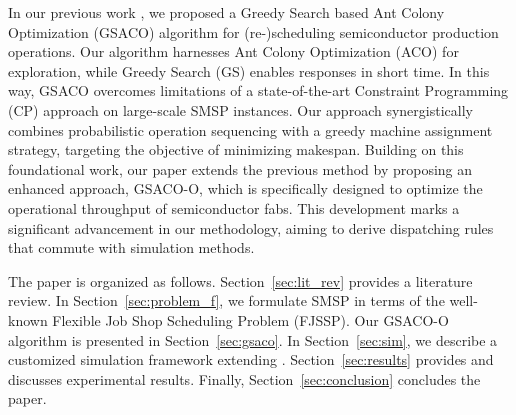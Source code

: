 In our previous work \cite{Ali2024}, we proposed a Greedy Search based Ant Colony Optimization (GSACO)
algorithm for (re-)scheduling semiconductor production operations. 
Our algorithm harnesses Ant Colony Optimization (ACO) \cite{Dorigo2019} for exploration, while
Greedy Search (GS) \cite{Papadimitriou} enables responses in short time. 
In this way, GSACO overcomes limitations of a state-of-the-art Constraint Programming (CP) approach \cite{Perron2023}
on large-scale SMSP instances. Our approach synergistically combines probabilistic operation sequencing with a greedy machine assignment strategy, targeting %
the objective of minimizing makespan. Building on this foundational work, our paper extends the previous method by proposing an enhanced approach, GSACO-O, which is specifically designed to optimize the operational throughput of semiconductor fabs. This development marks a significant advancement in our methodology, aiming to derive dispatching rules that commute with simulation methods.

The paper is organized as follows. 
Section~\ref{sec:lit_rev} provides a literature review.
In Section~\ref{sec:problem_f}, we formulate SMSP in terms of the well-known Flexible Job Shop Scheduling Problem (FJSSP). 
Our GSACO-O algorithm is presented in Section~\ref{sec:gsaco}.
In Section~\ref{sec:sim}, we describe a customized simulation framework extending \cite{Kovacs2022}.
Section~\ref{sec:results} provides and discusses experimental results.
Finally, Section~\ref{sec:conclusion} concludes the paper.




